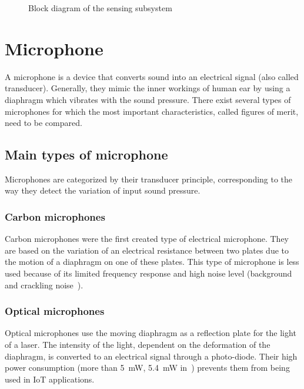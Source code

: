 \documentclass{EPL-master-thesis-covers-EN}
\newcommand{\te}[1]{\textrm{#1}}
\begin{document}
\begin{figure}[H]
\centering
{}
\caption{Block diagram of the sensing subsystem}
\label{fig:sensing_subsystem}
\end{figure}

\section{Microphone}

A microphone is a device that converts sound into an electrical signal (also called transducer). Generally, they mimic the inner workings of human ear by using a diaphragm which vibrates with the sound pressure. There exist several types of microphones for which the most important characteristics, called figures of merit, need to be compared.


\subsection*{Main types of microphone}

Microphones are categorized by their transducer principle, corresponding to the way they detect the variation of input sound pressure.

\subsubsection*{Carbon microphones}

Carbon microphones were the first created type of electrical microphone. They are based on the variation of an electrical resistance between two plates due to the motion of a diaphragm on one of these plates. This type of microphone is less used because of its limited frequency response and high noise level (background and crackling noise~\cite{background.noise}).

\subsubsection*{Optical microphones}

Optical microphones use the moving diaphragm as a reflection plate for the light of a laser. The intensity of the light, dependent on the deformation of the diaphragm, is converted to an electrical signal through a photo-diode. Their high power consumption (more than \SI{5}{mW}, \SI{5.4}{mW} in~\cite{optical_microphone})  prevents them from being used in IoT applications.
\end{document}
